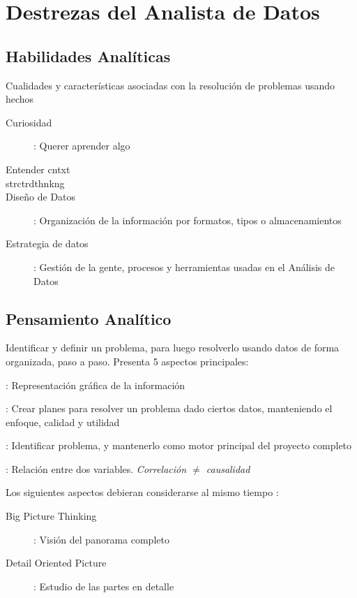 \section{Destrezas del Analista de Datos}

\subsection{Habilidades Analíticas}
Cualidades y características asociadas con la resolución de problemas usando hechos
\begin{description}
    \item[Curiosidad] : Querer aprender algo
    \item[Entender \gls{cntxt}]
    \item[\gls{strctrdthnkng}]
    \item[Diseño de Datos] : Organización de la información por formatos, tipos o almacenamientos
    \item[Estrategia de datos] : Gestión de la gente, procesos y herramientas usadas en el Análisis de Datos
\end{description}

\subsection{Pensamiento Analítico}
Identificar y definir un problema, para luego resolverlo usando datos de forma organizada, paso a paso. Presenta 5 aspectos principales:
\begin{description}
    \item[Visualización] : Representación gráfica de la información
    \item[Ser Estratégico] : Crear planes para resolver un problema dado ciertos datos, manteniendo el enfoque, calidad y utilidad
    \item[Pensamiento Orientado a Problemas] : Identificar problema, y mantenerlo como motor principal del proyecto completo
    \item[Correlación] : Relación entre dos variables. \textit{Correlación ${\neq}$ causalidad}
    \item{Los siguientes aspectos debieran considerarse al mismo tiempo :
    \begin{description}
        \item[Big Picture Thinking] : Visión del panorama completo
        \item[Detail Oriented Picture] : Estudio de las partes en detalle
    \end{description}}
\end{description}

